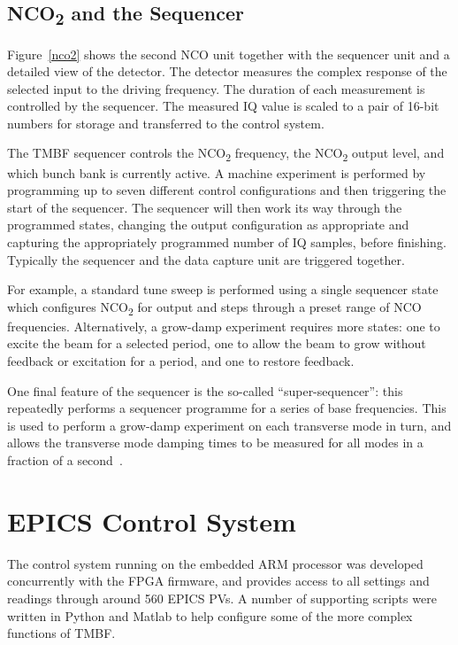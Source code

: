 \documentclass{jacow}
\begin{document}
\subsection{NCO\textsubscript2 and the Sequencer}

Figure~\ref{nco2} shows the second NCO unit together with the sequencer unit and
a detailed view of the detector.  The detector measures the complex response of
the selected input to the driving frequency.  The duration of each measurement
is controlled by the sequencer.  The measured IQ value is scaled to a pair of
16-bit numbers for storage and transferred to the control system.

The TMBF sequencer controls the NCO\textsubscript2 frequency, the
NCO\textsubscript2 output level, and which bunch bank is currently active.  A
machine experiment is performed by programming up to seven different control
configurations and then triggering the start of the sequencer.  The sequencer
will then work its way through the programmed states, changing the output
configuration as appropriate and capturing the appropriately programmed number
of IQ samples, before finishing.  Typically the sequencer and the data capture
unit are triggered together.

For example, a standard tune sweep is performed using a single sequencer state
which configures NCO\textsubscript2 for output and steps through a preset range
of NCO frequencies.  Alternatively, a grow-damp experiment requires more states:
one to excite the beam for a selected period, one to allow the beam to grow
without feedback or excitation for a period, and one to restore feedback.

One final feature of the sequencer is the so-called ``super-sequencer'': this
repeatedly performs a sequencer programme for a series of base frequencies.
This is used to perform a grow-damp experiment on each transverse mode in turn,
and allows the transverse mode damping times to be measured for all modes in a
fraction of a second~\cite{ibic2014}.


\section{EPICS Control System}

The control system running on the embedded ARM processor was developed
concurrently with the FPGA firmware, and provides access to all settings and
readings through around 560 EPICS PVs.  A number of supporting scripts were
written in Python and Matlab to help configure some of the more complex
functions of TMBF.
\end{document}

